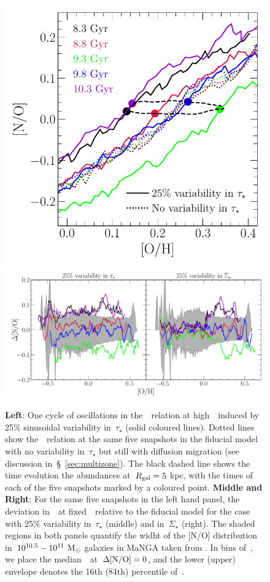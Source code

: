 \documentclass[ms.tex]{subfiles}
\begin{document}
\begin{figure}
\centering
\includegraphics[scale = 0.44]{no_oh_sfevar.pdf}
\includegraphics[scale = 0.47]{delta_no_schaefercomp.pdf}
\caption{
\textbf{Left}: One cycle of oscillations in the~\ohno~relation at
high~\oh~induced by 25\% sinusoidal variability in~$\tau_\star$ (solid coloured
lines).
Dotted lines show the~\ohno~relation at the same five snapshots in the fiducial
model with no variability in~$\tau_\star$ but still with diffusion migration
(see discussion in~\S~\ref{sec:multizone}).
The black dashed line shows the time evolution the abundances at~$R_\text{gal} = 5$
kpc, with the times of each of the five snapshots marked by a coloured point.
\textbf{Middle and Right}: For the same five snapshots in the left hand panel,
the deviation in~\no~at fixed~\oh~relative to the fiducial model for the case
with 25\% variability in~$\tau_\star$ (middle) and in~$\dot{\Sigma}_\star$
(right).
The shaded regions in both panels quantify the widht of the [N/O] distribution
in~$10^{10.5} - 10^{11}~\text{M}_\odot$ galaxies in MaNGA taken from
\citet{Schaefer2020}.
In bins of~\oh, we place the median~\no~at~$\Delta\text{[N/O]} = 0$, and the lower
(upper) envelope denotes the 16th (84th) percentile of~\no.
}
\label{fig:schaefer_comp}
\end{figure}
\end{document}
